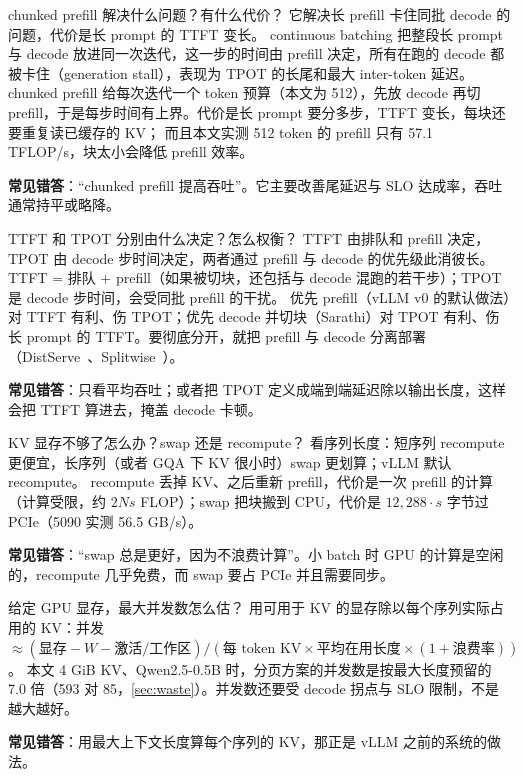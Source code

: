 \documentclass[11pt,a4paper]{ctexart}
\begin{document}
\begin{iqbox}{chunked prefill 解决什么问题？有什么代价？}
它解决长 prefill 卡住同批 decode 的问题，代价是长 prompt 的 TTFT 变长。
continuous batching 把整段长 prompt 与 decode 放进同一次迭代，这一步的时间由 prefill 决定，所有在跑的 decode 都被卡住（generation stall），表现为 TPOT 的长尾和最大 inter-token 延迟。
chunked prefill 给每次迭代一个 token 预算（本文为 512），先放 decode 再切 prefill，于是每步时间有上界。代价是长 prompt 要分多步，TTFT 变长，每块还要重复读已缓存的 KV；
而且本文实测 512 token 的 prefill 只有 57.1 TFLOP/s，块太小会降低 prefill 效率。
\par\textbf{常见错答}：“chunked prefill 提高吞吐”。它主要改善尾延迟与 SLO 达成率，吞吐通常持平或略降。
\end{iqbox}

\begin{iqbox}{TTFT 和 TPOT 分别由什么决定？怎么权衡？}
TTFT 由排队和 prefill 决定，TPOT 由 decode 步时间决定，两者通过 prefill 与 decode 的优先级此消彼长。
TTFT = 排队 + prefill（如果被切块，还包括与 decode 混跑的若干步）；TPOT 是 decode 步时间，会受同批 prefill 的干扰。
优先 prefill（vLLM v0 的默认做法）对 TTFT 有利、伤 TPOT；优先 decode 并切块（Sarathi）对 TPOT 有利、伤长 prompt 的 TTFT。要彻底分开，就把 prefill 与 decode 分离部署（DistServe~\cite{zhong2024}、Splitwise~\cite{patel2024}）。
\par\textbf{常见错答}：只看平均吞吐；或者把 TPOT 定义成端到端延迟除以输出长度，这样会把 TTFT 算进去，掩盖 decode 卡顿。
\end{iqbox}

\begin{iqbox}{KV 显存不够了怎么办？swap 还是 recompute？}
看序列长度：短序列 recompute 更便宜，长序列（或者 GQA 下 KV 很小时）swap 更划算；vLLM 默认 recompute。
recompute 丢掉 KV、之后重新 prefill，代价是一次 prefill 的计算（计算受限，约 $2Ns$ FLOP）；swap 把块搬到 CPU，代价是 $12{,}288\cdot s$ 字节过 PCIe（5090 实测 56.5 GB/s）。
\par\textbf{常见错答}：“swap 总是更好，因为不浪费计算”。小 batch 时 GPU 的计算是空闲的，recompute 几乎免费，而 swap 要占 PCIe 并且需要同步。
\end{iqbox}

\begin{iqbox}{给定 GPU 显存，最大并发数怎么估？}
用可用于 KV 的显存除以每个序列实际占用的 KV：并发 $\approx (\text{显存} - W - \text{激活/工作区}) / (\text{每 token KV}\times\text{平均在用长度}\times(1+\text{浪费率}))$。
本文 4 GiB KV、Qwen2.5-0.5B 时，分页方案的并发数是按最大长度预留的 7.0 倍（593 对 85，\cref{sec:waste}）。并发数还要受 decode 拐点与 SLO 限制，不是越大越好。
\par\textbf{常见错答}：用最大上下文长度算每个序列的 KV，那正是 vLLM 之前的系统的做法。
\end{iqbox}
\end{document}
